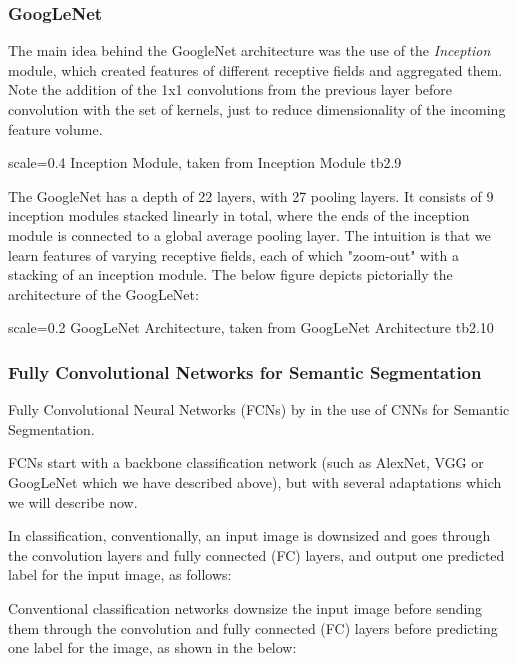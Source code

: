 \subsubsection{GoogLeNet}

The main idea behind the GoogleNet architecture was the use of the \emph{Inception} module, which created features of different receptive fields and aggregated them. Note the addition of the 1x1 convolutions from the previous layer before convolution with the set of kernels, just to reduce dimensionality of the incoming feature volume. 

{scale=0.4}%
{Inception Module, taken from \cite{Szegedy2015}}%
{Inception Module}%
{tb2.9} %

The GoogleNet has a depth of 22 layers, with 27 pooling layers. It consists of 9 inception modules stacked linearly in total, where the ends of the inception module is connected to a global average pooling layer. The intuition is that we learn features of varying receptive fields, each of which "zoom-out" with a stacking of an inception module. The below figure depicts pictorially the architecture of the GoogLeNet:

{scale=0.2}%
{GoogLeNet Architecture, taken from \cite{Karri2017}}%
{GoogLeNet Architecture}%
{tb2.10} %

\subsubsection{Fully Convolutional Networks for Semantic Segmentation}
Fully Convolutional Neural Networks (FCNs) by \cite{long2015} in the use of CNNs for Semantic Segmentation.  

FCNs start with a backbone classification network (such as AlexNet, VGG or GoogLeNet which we have described above), but with several adaptations which we will describe now. 

In classification, conventionally, an input image is downsized and goes through the convolution layers and fully connected (FC) layers, and output one predicted label for the input image, as follows:

Conventional classification networks downsize the input image before sending them through the convolution and fully connected (FC) layers before predicting one label for the image, as shown in the below:

